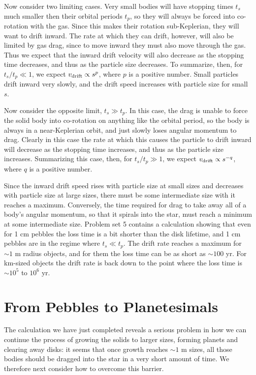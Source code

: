 Now consider two limiting cases. Very small bodies will have stopping times $t_s$ much smaller then their orbital periods $t_p$, so they will always be forced into co-rotation with the gas. Since this makes their rotation sub-Keplerian, they will want to drift inward. The rate at which they can drift, however, will also be limited by gas drag, since to move inward they must also move through the gas. Thus we expect that the inward drift velocity will also decrease as the stopping time decreases, and thus as the particle size decreases. To summarize, then, for $t_s/t_p \ll 1$, we expect $v_{\rm drift} \propto s^p$, where $p$ is a positive number. Small particles drift inward very slowly, and the drift speed increases with particle size for small $s$.

Now consider the opposite limit, $t_s \gg t_p$. In this case, the drag is unable to force the solid body into co-rotation on anything like the orbital period, so the body is always in a near-Keplerian orbit, and just slowly loses angular momentum to drag. Clearly in this case the rate at which this causes the particle to drift inward will decrease as the stopping time increases, and thus as the particle size increases. Summarizing this case, then, for $t_s/t_p \gg 1$, we expect $v_{\rm drift} \propto s^{-q}$, where $q$ is a positive number.

Since the inward drift speed rises with particle size at small sizes and decreases with particle size at large sizes, there must be some intermediate size with it reaches a maximum. Conversely, the time required for drag to take away all of a body's angular momentum, so that it spirals into the star, must reach a minimum at some intermediate size. Problem set 5 contains a calculation showing that even for 1 cm pebbles the loss time is a bit shorter than the disk lifetime, and 1 cm pebbles are in the regime where $t_s \ll t_p$. The drift rate reaches a maximum for $\sim 1$ m radius objects, and for them the loss time can be as short as $\sim 100$ yr. For km-sized objects the drift rate is back down to the point where the loss time is $\sim 10^5$ to $10^6$ yr. 

\section{From Pebbles to Planetesimals}

The calculation we have just completed reveals a serious problem in how we can continue the process of growing the solids to larger sizes, forming planets and clearing away disks: it seems that once growth reaches $\sim 1$ m sizes, all those bodies should be dragged into the star in a very short amount of time. We therefore next consider how to overcome this barrier.

